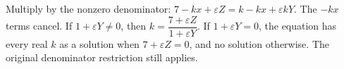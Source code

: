 Multiply by the nonzero denominator: $7-kx+\varepsilon Z=k-kx+\varepsilon kY$. The $-kx$ terms cancel. If $1+\varepsilon Y\ne0$, then $\boxed{k=\dfrac{7+\varepsilon Z}{1+\varepsilon Y}}$. If $1+\varepsilon Y=0$, the equation has every real $k$ as a solution when $7+\varepsilon Z=0$, and no solution otherwise. The original denominator restriction still applies.
